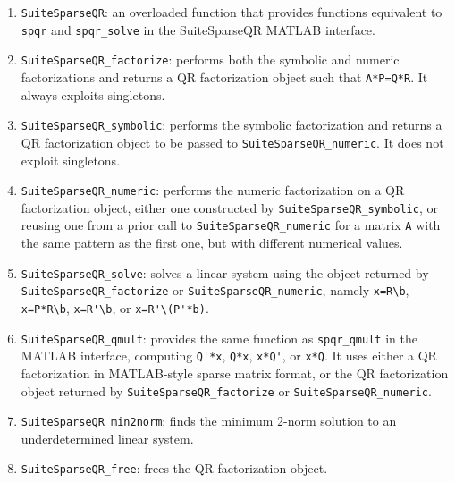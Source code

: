 \documentclass[12pt]{article}
\begin{document}
\begin{enumerate}

    \item \verb'SuiteSparseQR': an overloaded function that provides functions
    equivalent to \verb'spqr' and \verb'spqr_solve' in the SuiteSparseQR MATLAB
    interface.

    \item \verb'SuiteSparseQR_factorize': performs both the symbolic and
    numeric factorizations and returns a QR factorization object such that
    \verb'A*P=Q*R'.  It always exploits singletons.

    \item \verb'SuiteSparseQR_symbolic': performs the symbolic factorization
    and returns a QR factorization object to be passed to
    \verb'SuiteSparseQR_numeric'.  It does not exploit singletons.

    \item \verb'SuiteSparseQR_numeric': performs the numeric factorization on a
    QR factorization object, either one constructed by
    \verb'SuiteSparseQR_symbolic', or reusing one from a prior call to
    \verb'SuiteSparseQR_numeric' for a matrix \verb'A' with the same pattern as
    the first one, but with different numerical values.

    \item \verb'SuiteSparseQR_solve': solves a linear system using the object
    returned by \newline \verb'SuiteSparseQR_factorize' or
    \verb'SuiteSparseQR_numeric', namely \verb"x=R\b", \newline \verb"x=P*R\b",
    \verb"x=R'\b", or \verb"x=R'\(P'*b)".

    \item \verb'SuiteSparseQR_qmult': provides the same function as
    \verb'spqr_qmult' in the MATLAB interface, computing
    \verb"Q'*x", \verb"Q*x", \verb"x*Q'", or \verb"x*Q".
    It uses either a QR factorization
    in MATLAB-style sparse matrix format, or the QR factorization object
    returned by \newline \verb'SuiteSparseQR_factorize' or
    \verb'SuiteSparseQR_numeric'.

    \item \verb'SuiteSparseQR_min2norm': finds the minimum 2-norm solution to
    an underdetermined linear system.

    \item \verb'SuiteSparseQR_free': frees the QR factorization object.

\end{enumerate}
\end{document}
